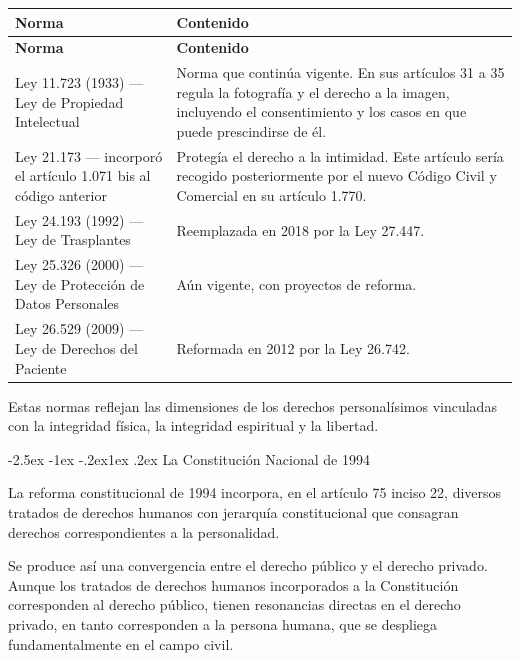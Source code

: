 \documentclass[12pt,oneside]{book}
\makeatletter
\renewcommand\subsection{\@startsection{subsection}{2}{\z@}%
  {-2.5ex \@plus -1ex \@minus -.2ex}{1ex \@plus .2ex}%
  {\normalfont\normalsize\bfseries}}
\makeatother
\begin{document}
\begin{longtable}{p{} p{}}
\toprule
\textbf{Norma} & \textbf{Contenido} \\
\midrule
\endfirsthead
\toprule
\textbf{Norma} & \textbf{Contenido} \\
\midrule
\endhead
Ley 11.723 (1933) --- Ley de Propiedad Intelectual & Norma que continúa vigente. En sus artículos 31 a 35 regula la fotografía y el derecho a la imagen, incluyendo el consentimiento y los casos en que puede prescindirse de él. \\
\addlinespace
Ley 21.173 --- incorporó el artículo 1.071 bis al código anterior & Protegía el derecho a la intimidad. Este artículo sería recogido posteriormente por el nuevo Código Civil y Comercial en su artículo 1.770. \\
\addlinespace
Ley 24.193 (1992) --- Ley de Trasplantes & Reemplazada en 2018 por la Ley 27.447. \\
\addlinespace
Ley 25.326 (2000) --- Ley de Protección de Datos Personales & Aún vigente, con proyectos de reforma. \\
\addlinespace
Ley 26.529 (2009) --- Ley de Derechos del Paciente & Reformada en 2012 por la Ley 26.742. \\
\bottomrule
\end{longtable}

Estas normas reflejan las dimensiones de los derechos personalísimos vinculadas con la integridad física, la integridad espiritual y la libertad.

\subsection{La Constitución Nacional de 1994}

La reforma constitucional de 1994 incorpora, en el artículo 75 inciso 22, diversos tratados de derechos humanos con jerarquía constitucional que consagran derechos correspondientes a la personalidad.

Se produce así una convergencia entre el derecho público y el derecho privado. Aunque los tratados de derechos humanos incorporados a la Constitución corresponden al derecho público, tienen resonancias directas en el derecho privado, en tanto corresponden a la persona humana, que se despliega fundamentalmente en el campo civil.
\end{document}

